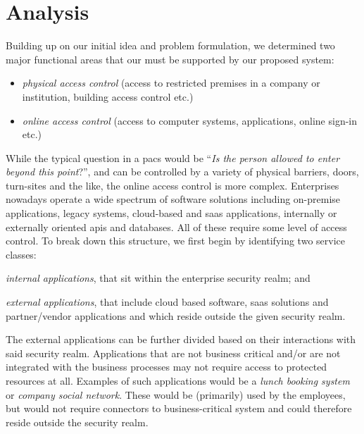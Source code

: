 \section{Analysis}

Building up on our initial idea and problem formulation, we determined two major functional areas that our must be supported by our proposed system:

\begin{itemize}[noitemsep]
    \item \textit{physical access control} (access to restricted premises in a company or institution, building access control etc.)
    \item \textit{online access control} (access to computer systems, applications, online sign-in etc.)
\end{itemize}

While the  typical question in a \acrshort{pacs}
would be ``\textit{Is the person allowed to enter beyond this point}?'', and can be controlled by a variety of physical barriers, doors, turn-sites and the like, the online access control is more complex. Enterprises nowadays operate a wide spectrum of software solutions including on-premise applications, legacy systems, cloud-based and \acrshort{saas} applications, internally or externally oriented \acrshort{api}s and databases. All of these require some level of access control. To break down this structure, we first begin by identifying two service classes:
\begin{enumerate*}[label=(\roman*)]
    \item \textit{internal applications}, that sit within the enterprise security realm; and 
    \item \textit{external applications}, that include cloud based software, \acrshort{saas} solutions and partner/vendor applications and which reside outside the given security realm.
\end{enumerate*}

The external applications can be further divided based on their interactions with said security realm. Applications that are not business critical and/or are not integrated with the business processes may not require access to protected resources at all. Examples of such applications would be a \textit{lunch booking system} or \textit{company social network}. These would be (primarily) used by the employees, but would not require connectors to business-critical system and could therefore reside outside the security realm.

